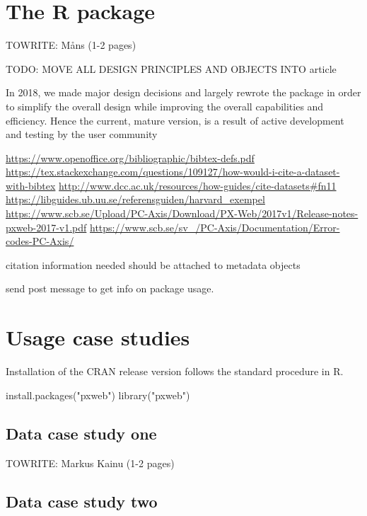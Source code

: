 \section[pxweb]{The  R package}

TOWRITE: Måns (1-2 pages)

TODO: MOVE ALL DESIGN PRINCIPLES AND OBJECTS INTO article

In 2018, we made major design decisions and largely rewrote the package in order to simplify the overall design while improving the overall capabilities and efficiency. Hence the current, mature version, is a result of active development and testing by the user community 


\url{https://www.openoffice.org/bibliographic/bibtex-defs.pdf}
\url{https://tex.stackexchange.com/questions/109127/how-would-i-cite-a-dataset-with-bibtex}
\url{http://www.dcc.ac.uk/resources/how-guides/cite-datasets#fn11}
\url{https://libguides.ub.uu.se/referensguiden/harvard\_exempel}
\url{https://www.scb.se/Upload/PC-Axis/Download/PX-Web/2017v1/Release-notes-pxweb-2017-v1.pdf}
\url{https://www.scb.se/sv\_/PC-Axis/Documentation/Error-codes-PC-Axis/}


citation information needed should be attached to metadata objects

send post message to get info on package usage.


\section[case studies]{Usage case studies}

Installation of the CRAN release version follows the standard procedure in R.

\begin{example}
  install.packages("pxweb")
  library("pxweb")
\end{example}



\subsection{Data case study one}

TOWRITE: Markus Kainu (1-2 pages)

\subsection{Data case study two}

